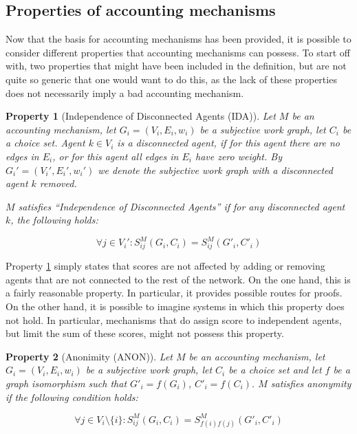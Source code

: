 \documentclass[a4paper,11pt]{book}
\newtheorem{property}{Property}
\theoremstyle{definition}
\begin{document}
\subsection{Properties of accounting mechanisms}

Now that the basis for accounting mechanisms has been provided, it is possible to consider different
properties that accounting mechanisms can possess. To start off with, two properties that might have
been included in the definition, but are not quite so generic that one would want to do this,
as the lack of these properties does not necessarily imply a bad accounting mechanism.

\begin{property}[Independence of Disconnected Agents (IDA)]
    Let $M$ be an accounting mechanism, let $G_i = (V_i, E_i, w_i)$ be a subjective work graph, let 
    $C_i$ be a choice set. Agent $k \in V_i$ is a disconnected agent, if for this agent there are no edges
    in $E_i$, or for this agent all edges in $E_i$ have zero weight. By $G_i' = (V_i', E_i', w_i')$ we denote the subjective
    work graph with a disconnected agent $k$ removed.

    $M$ satisfies ``Independence of Disconnected Agents'' if for any disconnected agent $k$, the following
    holds:

    \begin{equation*}
        \forall j \in V_i' : S_{ij}^M(G_i, C_i) = S_{ij}^M(G'_i, C'_i)
    \end{equation*}
    \label{prop:ida}
\end{property}

Property \ref{prop:ida} simply states that scores are not affected by adding or removing agents
that are not connected to the rest of the network. On the one hand, this is a fairly reasonable property.
In particular, it provides possible routes for proofs. On the other hand, it is possible to imagine systems
in which this property does not hold. In particular, mechanisms that do assign score to independent agents,
but limit the sum of these scores, might not possess this property.


\begin{property}[Anonimity (ANON)]
    Let $M$ be an accounting mechanism, let $G_i = (V_i, E_i, w_i)$ be a subjective work graph, let 
    $C_i$ be a choice set and let $f$ be a graph isomorphism such that $G'_i = f(G_i)$, $C'_i = f(C_i)$.
    $M$ satisfies anonymity if the following condition holds:

    \begin{equation*}
        \forall j \in V_i \setminus \{i\} : S_{ij}^M(G_i, C_i) = S_{f(i)f(j)}^M(G'_i, C'_i)
    \end{equation*}
    \label{prop:anon}
\end{property}
\end{document}
